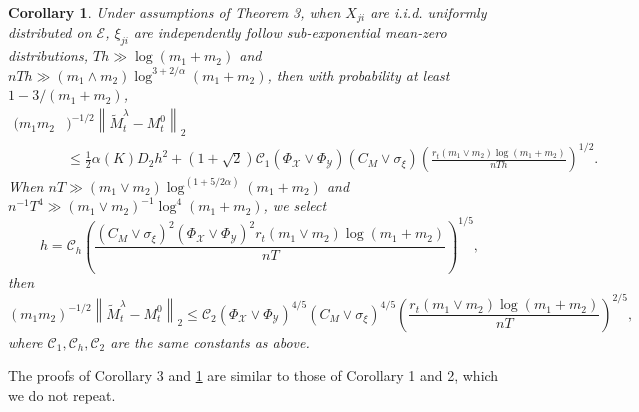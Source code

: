 \documentclass[12pt]{article}
\newtheorem{cor}{Corollary}
\begin{document}
\begin{cor}
  \label{cor_matrix_completion_mixing}
  Under assumptions of Theorem 3,  when $X_{ji}$ are i.i.d. uniformly distributed on $\mathcal{E}$, $\xi_{ji}$ are independently follow sub-exponential mean-zero distributions, $Th \gg\log (m_1+m_2)$ and $n T h \gg (m_1\wedge m_2)\log^{3+2/\alpha} (m_1+m_2)$,
  then with probability at least $1-3/(m_1+m_2)$,
  \begin{align*}
  (m_1m_2&)^{-1/2}\left\|\widetilde{M}_t^\lambda - M_t^0\right\|_2 \\&\le
  \frac{1}{2}\alpha(K)D_2h^2+
  (1+\sqrt{2})\mathcal{C}_1(\Phi_{\mathcal{X}}\vee \Phi_{\mathcal{Y}}) (C_M\vee \sigma_\xi)\left(\frac{r_t(m_1\vee m_2)\log (m_1+m_2)}{nTh}\right)^{1/2}.
  \end{align*}
  When $nT\gg (m_1\vee m_2)\log^{(1+5/2\alpha)}(m_1+m_2)$ and $n^{-1}T^4\gg (m_1\vee m_2)^{-1}\log^4(m_1+m_2)$,  we select
  $$h=\mathcal{C}_{h}\left(\frac{(C_M\vee \sigma_\xi)^2(\Phi_{\mathcal{X}}\vee \Phi_{\mathcal{Y}})^2r_t(m_1\vee m_2)\log(m_1+m_2)}{nT}\right)^{1/5},$$
  then
  \begin{equation}\label{eq_upper_bound_mc_mixing}
  (m_1m_2)^{-1/2}\left\|\widetilde{M}_t^\lambda - M_t^0\right\|_2 \le \mathcal{C}_2(\Phi_{\mathcal{X}}\vee \Phi_{\mathcal{Y}})^{4/5}(C_M\vee \sigma_\xi)^{4/5}\left(\frac{r_t(m_1\vee m_2)\log(m_1+m_2)}{nT}\right)^{2/5},
  \end{equation}
  where $\mathcal{C}_1,\mathcal{C}_h,\mathcal{C}_2$ are the same constants as above.
  \end{cor}
 
The proofs of Corollary 3 %
and \ref{cor_matrix_completion_mixing} are similar to those of Corollary 1 %
 and 2, which we do not repeat.
\end{document}
